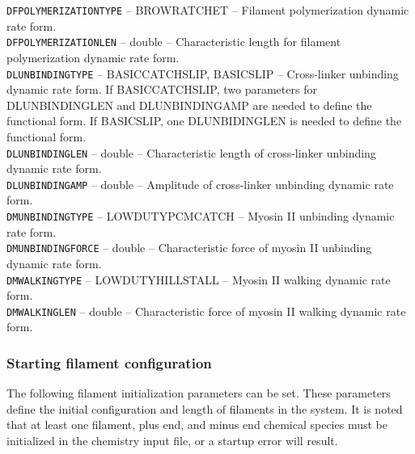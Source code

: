 \documentclass[11pt, oneside]{article}   	%
\begin{document}
\small

  \noindent\texttt{DFPOLYMERIZATIONTYPE} -- BROWRATCHET -- Filament polymerization dynamic rate form. \\
  
  \noindent\texttt{DFPOLYMERIZATIONLEN} -- double -- Characteristic length for filament polymerization dynamic rate form. \\
   
  \noindent\texttt{DLUNBINDINGTYPE} -- BASICCATCHSLIP, BASICSLIP -- Cross-linker unbinding dynamic rate form. 
  If BASICCATCHSLIP, two
  parameters for DLUNBINDINGLEN and DLUNBINDINGAMP are needed to define the functional form. 
  If BASICSLIP, one 
  DLUNBIDINGLEN is needed to define the functional form. \\
   
  \noindent\texttt{DLUNBINDINGLEN} -- double -- Characteristic length of cross-linker unbinding dynamic rate form. \\
   
   \noindent\texttt{DLUNBINDINGAMP} -- double -- Amplitude of cross-linker unbinding dynamic rate form. \\
   
   \noindent\texttt{DMUNBINDINGTYPE} -- LOWDUTYPCMCATCH -- Myosin II unbinding dynamic rate form. \\
   
   \noindent\texttt{DMUNBINDINGFORCE} -- double -- Characteristic force of myosin II unbinding dynamic rate form. \\
   
   \noindent\texttt{DMWALKINGTYPE} -- LOWDUTYHILLSTALL -- Myosin II walking dynamic rate form. \\ 
   
   \noindent\texttt{DMWALKINGLEN} -- double -- Characteristic force of myosin II walking dynamic rate form. \\
   
 
\normalsize

\subsubsection{Starting filament configuration}

The following filament initialization parameters can be set. These parameters define the initial configuration and length
of filaments in the system. It is noted that at least one filament, plus end, and minus end chemical species must be initialized in the chemistry input file, or a startup error will result.\\
\end{document}
